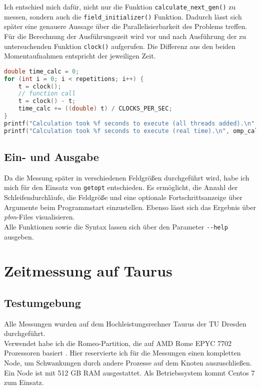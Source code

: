 \documentclass[german,plainarticle,hyperref,utf8]{zihpub}
\begin{document}
	Ich entschied mich dafür, nicht nur die Funktion \texttt{calculate\_next\_gen()} zu messen, sondern auch die \texttt{field\_initializer()} Funktion. Dadurch lässt sich später eine genauere Aussage über die Parallelisierbarkeit des Problems treffen. Für die Berechnung der Ausführungszeit wird vor und nach Ausführung der zu untersuchenden Funktion \texttt{clock()} aufgerufen. Die Differenz aus den beiden Momentaufnahmen entspricht der jeweiligen Zeit.\\
	\newpage
	\begin{lstlisting}[language=C, caption=Berechnung der Ausführungszeit eines \textit{function calls}]
double time_calc = 0;
for (int i = 0; i < repetitions; i++) {
	t = clock();
	// function call
	t = clock() - t;
	time_calc += ((double) t) / CLOCKS_PER_SEC;
}
printf("Calculation took %f seconds to execute (all threads added).\n", time_calc);
printf("Calculation took %f seconds to execute (real time).\n", omp_calc);
\end{lstlisting}
	
	\subsection{Ein- und Ausgabe}
	Da die Messung später in verschiedenen Feldgrößen durchgeführt wird, habe ich mich für den Einsatz von \verb|getopt| entschieden. Es ermöglicht, die Anzahl der Schleifendurchläufe, die Feldgröße und eine optionale Fortschrittsanzeige über Argumente beim Programmstart einzustellen.
	Ebenso lässt sich das Ergebnis über \textit{pbm}-Files visualisieren.\\
	Alle Funktionen sowie die Syntax lassen sich über den Parameter \texttt{-{}-help} ausgeben.
	\newpage
	\section{Zeitmessung auf Taurus}
	\subsection{Testumgebung} \label{umgebung}
	Alle Messungen wurden auf dem Hochleistungsrechner Taurus der TU Dresden durchgeführt.\\
	Verwendet habe ich die Romeo-Partition, die auf AMD Rome EPYC 7702 Prozessoren basiert \cite{hpc}. Hier reservierte ich für die Messungen einen kompletten Node, um Schwankungen durch andere Prozesse auf dem Knoten auszuschließen. Ein Node ist mit 512 GB RAM ausgestattet. Als Betriebssystem kommt Centos 7 zum Einsatz.\\
	
\end{document}
